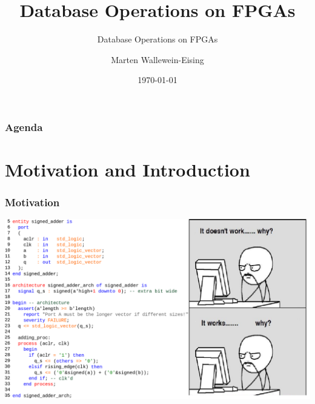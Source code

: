 \documentclass{beamer}
\title{Database Operations on FPGAs}
\subtitle{Database Operations on FPGAs}
\author{Marten Wallewein-Eising}
\date{\today}
\institute{Otto von Guericke University, Magdeburg}
\begin{document}
\begin{frame}[plain]
 \titlepage
\end{frame}

\section[Agenda]{}
\begin{frame}
	\frametitle{Agenda}
	\tableofcontents
\end{frame}

\section{Motivation and Introduction}
\begin{frame}
	\frametitle{Motivation}
	\includegraphics[width=1.0\textwidth]{img/complex_source.png}
\end{frame}
\end{document}
